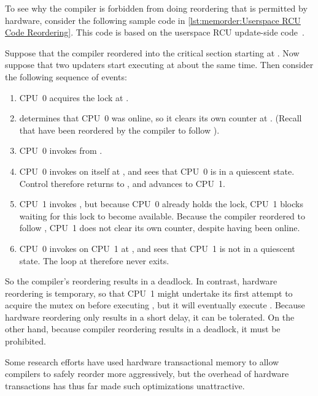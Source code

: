 {	To see why the compiler is forbidden from doing reordering that
	is permitted by hardware, consider the following sample code
	in \cref{lst:memorder:Userspace RCU Code Reordering}.
	This code is based on the userspace RCU update-side
	code~\cite[Supplementary Materials Figure 5]{MathieuDesnoyers2012URCU}.

\begin{fcvref}
	Suppose that the compiler reordered  into
	the critical section starting at .
	Now suppose that two updaters start executing 
	at about the same time.
	Then consider the following sequence of events:
	\begin{enumerate}
	\item	CPU~0 acquires the lock at .
	\item	{} determines that CPU~0 was online, so it clears
		its own counter at .
		(Recall that  have been reordered by the
		compiler to follow ).
	\item	CPU~0 invokes  from
		.
	\item	CPU~0 invokes  on itself at
		, and  sees that CPU~0 is
		in a quiescent state.
		Control therefore returns to ,
		and  advances to CPU~1.
	\item	CPU~1 invokes , but because CPU~0
		already holds the lock, CPU~1 blocks waiting for this
		lock to become available.
		Because the compiler reordered  to follow
		, CPU~1 does not clear its own counter,
		despite having been online.
	\item	CPU~0 invokes  on CPU~1 at
		, and  sees that CPU~1 is
		not in a quiescent state.
		The  loop at  therefore never
		exits.
	\end{enumerate}

	So the compiler's reordering results in a deadlock.
	In contrast, hardware reordering is temporary, so that CPU~1
	might undertake its first attempt to acquire the mutex on
	 before executing , but it
	will eventually execute .
	Because hardware reordering only results in a short delay, it
	can be tolerated.
	On the other hand, because compiler reordering results in a
	deadlock, it must be prohibited.

	Some research efforts have used hardware transactional memory
	to allow compilers to safely reorder more aggressively, but
	the overhead of hardware transactions has thus far made
	such optimizations unattractive.
\end{fcvref}
}\QuickQuizEnd

